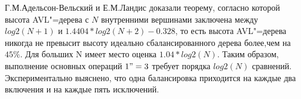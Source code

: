 Г.М.Адельсон-Вельский и Е.М.Ландис доказали теорему,
согласно которой высота AVL"=дерева с $N$ внутренними вершинами заключена между $log2(N+1)$ и $1.4404*log2(N+2)-0.328$,
то есть высота AVL"=дерева никогда не превысит высоту идеально сбалансированного дерева более,чем на $45\%$.
Для больших N имеет место оценка $1.04*log2(N)$.
Таким образом, выполнение основных операций $1"=3$ требует порядка $log2(N)$ сравнений.
Экспериментально выяснено, что одна балансировка приходится на каждые два включения и на каждые пять исключений.